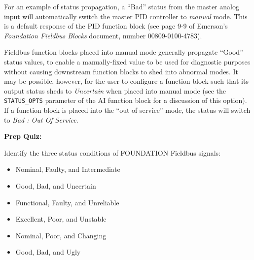 \vskip 10pt

For an example of status propagation, a ``Bad'' status from the master analog input will automatically switch the master PID controller to {\it manual} mode.  This is a default response of the PID function block (see page 9-9 of Emerson's {\it Foundation Fieldbus Blocks} document, number 00809-0100-4783).

\vskip 10pt

Fieldbus function blocks placed into manual mode generally propagate ``Good'' status values, to enable a manually-fixed value to be used for diagnostic purposes without causing downstream function blocks to shed into abnormal modes.  It may be possible, however, for the user to configure a function block such that its output status sheds to {\it Uncertain} when placed into manual mode (see the {\tt STATUS\_OPTS} parameter of the AI function block for a discussion of this option).  If a function block is placed into the ``out of service'' mode, the status will switch to {\it Bad : Out Of Service}.




\vfil \eject

\noindent
{\bf Prep Quiz:}

Identify the three status conditions of FOUNDATION Fieldbus signals:

\begin{itemize}
\item{} Nominal, Faulty, and Intermediate
\vskip 5pt 
\item{} Good, Bad, and Uncertain
\vskip 5pt 
\item{} Functional, Faulty, and Unreliable
\vskip 5pt 
\item{} Excellent, Poor, and Unstable
\vskip 5pt 
\item{} Nominal, Poor, and Changing
\vskip 5pt 
\item{} Good, Bad, and Ugly
\end{itemize}





